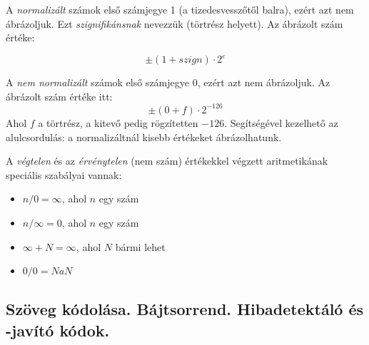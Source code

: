 \documentclass[a4paper]{article}
\begin{document}
A \emph{normalizált} számok első számjegye 1 (a tizedesvesszőtől balra), ezért azt nem ábrázoljuk. Ezt \emph{szignifikánsnak} nevezzük (törtrész helyett). Az ábrázolt szám értéke:

$$\pm (1 + szign) \cdot 2^{e}$$

A \emph{nem normalizált} számok első számjegye 0, ezért azt nem ábrázoljuk. Az ábrázolt szám értéke itt:
$$\pm (0 + f) \cdot 2^{-126}$$
Ahol $f$ a törtrész, a kitevő pedig rögzítetten $-126$. Segítségével kezelhető az alulcsordulás: a normalizáltnál kisebb értékeket ábrázolhatunk.

A \emph{végtelen} és az \emph{érvénytelen} (nem szám) értékekkel végzett aritmetikának speciális szabályai vannak:
\begin{itemize}
	\item $n/0=\infty$, ahol $n$ egy szám
	\item $n/\infty=0$, ahol $n$ egy szám
	\item $\infty + N=\infty$, ahol $N$ bármi lehet
	\item $0/0=NaN$
\end{itemize}

\subsection{Szöveg kódolása. Bájtsorrend. Hibadetektáló és -javító kódok.}
\end{document}
